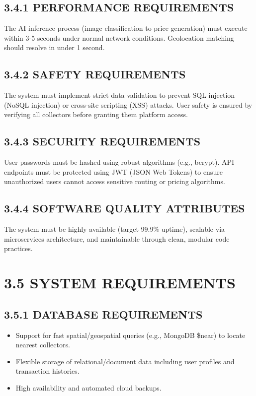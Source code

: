 \subsection{3.4.1 PERFORMANCE REQUIREMENTS}
The AI inference process (image classification to price generation) must execute within 3-5 seconds under normal network conditions. Geolocation matching should resolve in under 1 second.

\subsection{3.4.2 SAFETY REQUIREMENTS}
The system must implement strict data validation to prevent SQL injection (NoSQL injection) or cross-site scripting (XSS) attacks. User safety is ensured by verifying all collectors before granting them platform access.

\subsection{3.4.3 SECURITY REQUIREMENTS}
User passwords must be hashed using robust algorithms (e.g., bcrypt). API endpoints must be protected using JWT (JSON Web Tokens) to ensure unauthorized users cannot access sensitive routing or pricing algorithms.

\subsection{3.4.4 SOFTWARE QUALITY ATTRIBUTES}
The system must be highly available (target 99.9\% uptime), scalable via microservices architecture, and maintainable through clean, modular code practices.

\section{3.5 SYSTEM REQUIREMENTS}

\subsection{3.5.1 DATABASE REQUIREMENTS}
\begin{itemize}
    \item Support for fast spatial/geospatial queries (e.g., MongoDB \$near) to locate nearest collectors.
    \item Flexible storage of relational/document data including user profiles and transaction histories.
    \item High availability and automated cloud backups.
\end{itemize}

